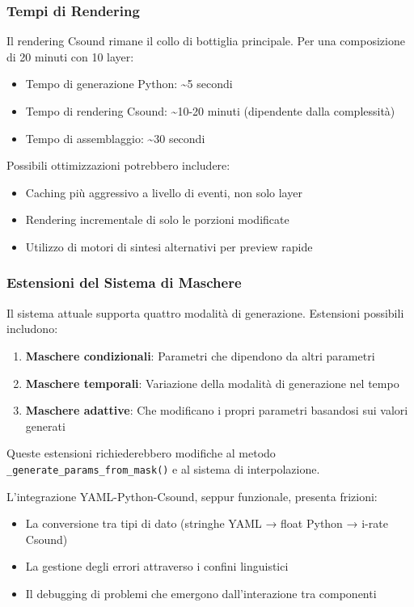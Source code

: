 \subsubsection{Tempi di Rendering}
Il rendering Csound rimane il collo di bottiglia principale. Per una composizione di 20 minuti con 10 layer:
\begin{itemize}
    \item Tempo di generazione Python: \textasciitilde{}5 secondi
    \item Tempo di rendering Csound: \textasciitilde{}10-20 minuti (dipendente dalla complessità)
    \item Tempo di assemblaggio: \textasciitilde{}30 secondi
\end{itemize}

Possibili ottimizzazioni potrebbero includere:
\begin{itemize}
    \item Caching più aggressivo a livello di eventi, non solo layer
    \item Rendering incrementale di solo le porzioni modificate
    \item Utilizzo di motori di sintesi alternativi per preview rapide
\end{itemize}
\subsubsection{Estensioni del Sistema di Maschere}
Il sistema attuale supporta quattro modalità di generazione. Estensioni possibili includono:

\begin{enumerate}
    \item \textbf{Maschere condizionali}: Parametri che dipendono da altri parametri
    \item \textbf{Maschere temporali}: Variazione della modalità di generazione nel tempo
    \item \textbf{Maschere adattive}: Che modificano i propri parametri basandosi sui valori generati
\end{enumerate}
Queste estensioni richiederebbero modifiche al metodo \texttt{\_generate\_params\_from\_mask()} e al sistema di interpolazione.

L'integrazione YAML-Python-Csound, seppur funzionale, presenta frizioni:

\begin{itemize}
    \item La conversione tra tipi di dato (stringhe YAML → float Python → i-rate Csound)
    \item La gestione degli errori attraverso i confini linguistici
    \item Il debugging di problemi che emergono dall'interazione tra componenti
\end{itemize}
